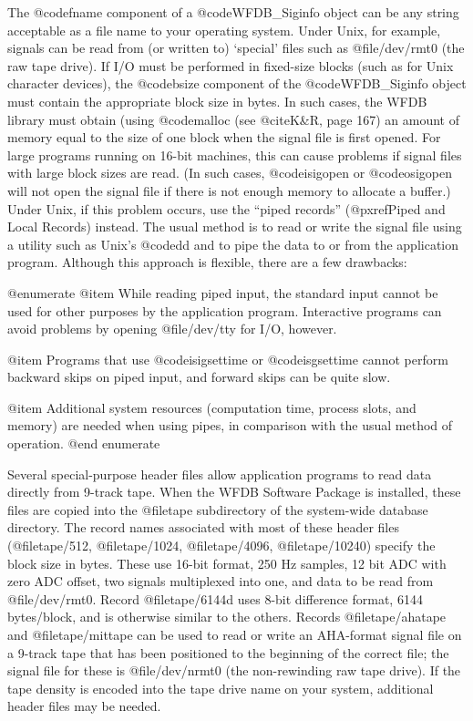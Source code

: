 {{{{{{{{{{{{{{The @code{fname} component of a @code{WFDB_Siginfo} object can be any
string acceptable as a file name to your operating system.  Under Unix,
for example, signals can be read from (or written to) `special' files
such as @file{/dev/rmt0} (the raw tape drive).  If I/O must be performed
in fixed-size blocks (such as for Unix character devices), the
@code{bsize} component of the @code{WFDB_Siginfo} object must contain the
appropriate block size in bytes.  In such cases, the WFDB library must
obtain (using @code{malloc} (see @cite{K&R}, page 167) an amount of
memory equal to the size of one block when the signal file is first
opened.  For large programs running on 16-bit machines, this can cause
problems if signal files with large block sizes are read.  (In such
cases, @code{isigopen} or @code{osigopen} will not open the signal file
if there is not enough memory to allocate a buffer.)  Under Unix, if
this problem occurs, use the ``piped records'' (@pxref{Piped and Local
Records}) instead.  The usual method is to read or write the signal file
using a utility such as Unix's @code{dd} and to pipe the data to or from
the application program.  Although this approach is flexible, there are
a few drawbacks:

@enumerate
@item
While reading piped input, the standard input cannot be used for other
purposes by the application program.  Interactive programs can avoid
problems by opening @file{/dev/tty} for I/O, however.

@item
Programs that use @code{isigsettime} or @code{isgsettime} cannot perform
backward skips on piped input, and forward skips can be quite slow.

@item
Additional system resources (computation time, process slots, and
memory) are needed when using pipes, in comparison with the usual
method of operation.
@end enumerate

Several special-purpose header files allow application programs to read data
directly from 9-track tape.  When the WFDB Software Package is installed, these
files are copied into the @file{tape} subdirectory of the system-wide database
directory.  The record names associated with most of these header files
(@file{tape/512}, @file{tape/1024}, @file{tape/4096}, @file{tape/10240})
specify the block size in bytes.  These use 16-bit format, 250 Hz samples, 12
bit ADC with zero ADC offset, two signals multiplexed into one, and data to be
read from @file{/dev/rmt0}.  Record @file{tape/6144d} uses 8-bit difference
format, 6144 bytes/block, and is otherwise similar to the others.  Records
@file{tape/ahatape} and @file{tape/mittape} can be used to read or write an
AHA-format signal file on a 9-track tape that has been positioned to the
beginning of the correct file; the signal file for these is @file{/dev/nrmt0}
(the non-rewinding raw tape drive).  If the tape density is encoded into the
tape drive name on your system, additional header files may be needed.

}}}}}}}}}}}}}}
